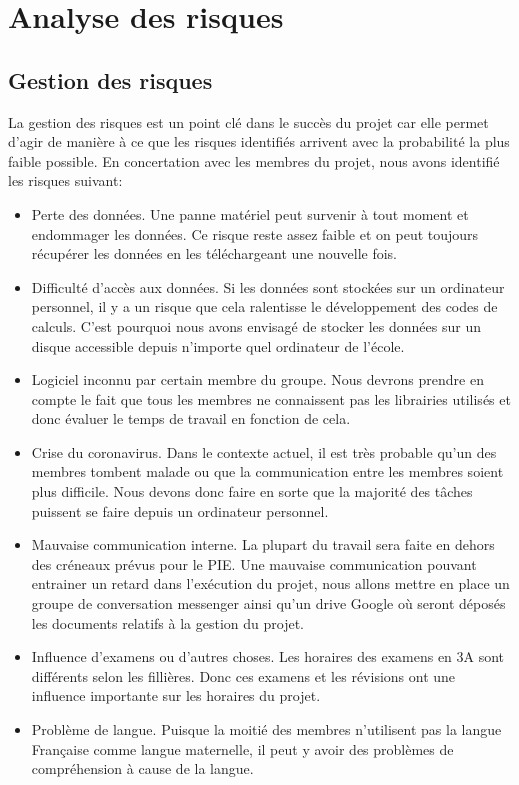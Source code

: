 \chapter*{Analyse des risques}
\label{sec:risques}
\section*{Gestion des risques}
La gestion des risques est un point clé dans le succès du projet car elle permet d'agir de manière à ce que les risques identifiés arrivent avec la probabilité la plus faible possible. En concertation avec les membres du projet, nous avons identifié les risques suivant:

\begin{itemize}
	\item Perte des données. Une panne matériel peut survenir à tout moment et endommager les données. Ce risque reste assez faible et on peut toujours récupérer les données en les téléchargeant une nouvelle fois.
	
	\item Difficulté d'accès aux données. Si les données sont stockées sur un ordinateur personnel, il y a un risque que cela ralentisse le développement des codes de calculs. C'est pourquoi nous avons envisagé de stocker les données sur un disque accessible depuis n'importe quel ordinateur de l'école.
	
	\item Logiciel inconnu par certain membre du groupe. Nous devrons prendre en compte le fait que tous les membres ne connaissent pas les librairies utilisés et donc évaluer le temps de travail en fonction de cela.
	
	\item Crise du coronavirus. Dans le contexte actuel, il est très probable qu'un des membres tombent malade ou que la communication entre les membres soient plus difficile. Nous devons donc faire en sorte que la majorité des tâches puissent se faire depuis un ordinateur personnel.
	
	\item Mauvaise communication interne. La plupart du travail sera faite en dehors des créneaux prévus pour le PIE. Une mauvaise communication pouvant entrainer un retard dans l'exécution du projet, nous allons mettre en place un groupe de conversation messenger ainsi qu'un drive Google où seront déposés les documents relatifs à la gestion du projet.
	
	\item Influence d'examens ou d'autres choses. Les horaires des examens en 3A sont différents selon les fillières. Donc ces examens et les révisions ont une influence importante sur les horaires du projet.
	
	\item Problème de langue. Puisque la moitié des membres n'utilisent pas la langue Française comme langue maternelle, il peut y avoir des problèmes de compréhension à cause de la langue.
	
	
\end{itemize}

